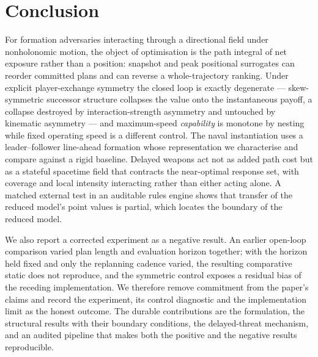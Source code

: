 \documentclass[12pt,a4paper]{article}
\begin{document}
\section{Conclusion}\label{sec:conclusion}

For formation adversaries interacting through a directional field under
nonholonomic motion, the object of optimisation is the path integral of net
exposure rather than a position: snapshot and peak positional surrogates can
reorder committed plans and can reverse a whole-trajectory ranking.  Under
explicit player-exchange symmetry the closed loop is exactly degenerate ---
skew-symmetric successor structure collapses the value onto the instantaneous
payoff, a collapse destroyed by interaction-strength asymmetry and untouched
by kinematic asymmetry --- and maximum-speed \emph{capability} is monotone by
nesting while fixed operating speed is a different control.  The naval
instantiation uses a leader--follower line-ahead formation whose representation
we characterise and compare against a rigid baseline.  Delayed weapons act not
as added path cost but as a stateful spacetime field that contracts the
near-optimal response set, with coverage and local intensity interacting
rather than either acting alone.  A matched external test in an auditable
rules engine shows that transfer of the reduced model's point values is
partial, which locates the boundary of the reduced model.

We also report a corrected experiment as a negative result.  An earlier
open-loop comparison varied plan length and evaluation horizon together; with
the horizon held fixed and only the replanning cadence varied, the resulting
comparative static does not reproduce, and the symmetric control exposes a
residual bias of the receding implementation.  We therefore remove commitment
from the paper's claims and record the experiment, its control diagnostic and
the implementation limit as the honest outcome.  The durable contributions are
the formulation, the structural results with their boundary conditions, the
delayed-threat mechanism, and an audited pipeline that makes both the
positive and the negative results reproducible.
\end{document}
